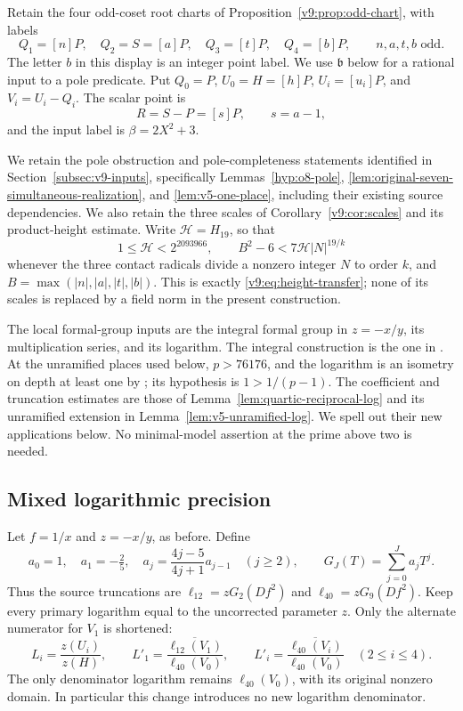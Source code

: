 Retain the four odd-coset root charts of
Proposition~\ref{v9:prop:odd-chart}, with labels
\[
 Q_1=[n]P,\quad Q_2=S=[a]P,\quad
 Q_3=[t]P,\quad Q_4=[b]P,
 \qquad n,a,t,b\text{ odd}.
\]
The letter $b$ in this display is an integer point label.  We use
$\mathfrak b$ below for a rational input to a pole predicate.
Put $Q_0=P$, $U_0=H=[h]P$, $U_i=[u_i]P$, and
$V_i=U_i-Q_i$.  The scalar point is
\[
 R=S-P=[s]P,\qquad s=a-1,
\]
and the input label is $\beta=2X^2+3$.

We retain the pole obstruction and pole-completeness statements
identified in Section~\ref{subsec:v9-inputs}, specifically
Lemmas~\ref{hyp:o8-pole}, \ref{lem:original-seven-simultaneous-realization},
and \ref{lem:v5-one-place}, including their existing source dependencies.
We also retain the three scales of Corollary~\ref{v9:cor:scales} and
its product-height estimate.  Write $\mathcal H=H_{19}$, so that
\begin{equation}\label{eq:v12-height-input}
 1\le\mathcal H<2^{2093966},\qquad
 B^2-6<7\mathcal H|N|^{19/k}
\end{equation}
whenever the three contact radicals divide a nonzero integer $N$
to order $k$, and $B=\max(|n|,|a|,|t|,|b|)$.
This is exactly \eqref{v9:eq:height-transfer}; none of its scales is
replaced by a field norm in the present construction.

The local formal-group inputs are the integral formal group in
$z=-x/y$, its multiplication series, and its logarithm.  The integral
construction is the one in \cite[IV\S1, Example~IV.2.2.3 and
Proposition~IV.2.3(a)]{silverman}.  At the unramified places used below,
$p>76176$, and the logarithm is an isometry on depth at least one by
\cite[Theorem IV.6.4, p.~132]{silverman}; its hypothesis is
$1>1/(p-1)$.  The coefficient and truncation estimates are those of
Lemma~\ref{lem:quartic-reciprocal-log} and its unramified extension in
Lemma~\ref{lem:v5-unramified-log}.  We spell out their new applications
below.  No minimal-model assertion at the prime above two is needed.

\subsection{Mixed logarithmic precision}\label{subsec:v12-mixed}

Let $f=1/x$ and $z=-x/y$, as before.  Define
\[
 a_0=1,\quad a_1=-\tfrac25,\quad
 a_j=\frac{4j-5}{4j+1}a_{j-1}\quad(j\ge2),\qquad
 G_J(T)=\sum_{j=0}^J a_jT^j.
\]
Thus the source truncations are
$\ell_{12}=zG_2(Df^2)$ and $\ell_{40}=zG_9(Df^2)$.
Keep every primary logarithm equal to the uncorrected parameter $z$.
Only the alternate numerator for $V_1$ is shortened:
\begin{equation}\label{eq:v12-ratios}
 L_i=\frac{z(U_i)}{z(H)},\qquad
 L'_1=\overline{\frac{\ell_{12}(V_1)}{\ell_{40}(V_0)}},\qquad
 L'_i=\overline{\frac{\ell_{40}(V_i)}{\ell_{40}(V_0)}}\quad(2\le i\le4).
\end{equation}
The only denominator logarithm remains $\ell_{40}(V_0)$, with its
original nonzero domain.  In particular this change introduces no
new logarithm denominator.

